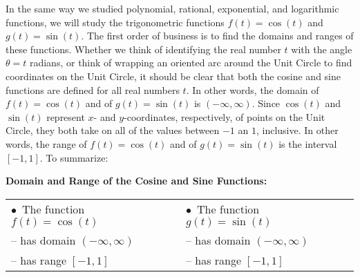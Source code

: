 In the same way we studied polynomial, rational, exponential, and logarithmic functions, we will study the trigonometric functions $f(t) = \cos(t)$ and $g(t) = \sin(t)$.  The first order of business is to find the domains and ranges of these functions.  Whether we think of identifying the real number $t$ with the angle $\theta = t$ radians, or think of wrapping an oriented arc around the Unit Circle to find coordinates on the Unit Circle, it should be clear that both the cosine and sine functions are defined for all real numbers $t$.  In other words, the domain  of $f(t) = \cos(t)$ and of $g(t) = \sin(t)$ is $(-\infty, \infty)$.  Since $\cos(t)$ and $\sin(t)$ represent $x$- and $y$-coordinates, respectively, of points on the Unit Circle, they both take on all of the values between $-1$ an $1$, inclusive.  In other words, the range of $f(t) = \cos(t)$ and of $g(t) = \sin(t)$ is the interval $[-1,1]$.  To summarize:

\smallskip

\colorbox{ResultColor}{\bbm

\begin{thm} \label{cosinesinefunctiondomainrange}  \textbf{Domain and Range of the Cosine and Sine Functions:} 

\vspace{.2in}

\begin{tabular}{ll}

\hspace{.3in} $\bullet \, $ The function $f(t) = \cos(t)$ & \hspace{.8in} $\bullet \, $ The function $g(t) = \sin(t)$ \\ [4pt]
\hspace{.5in} -- has domain $(-\infty, \infty)$ & \hspace{1in} -- has domain $(-\infty, \infty)$ \\ [4pt]
\hspace{.5in} -- has range $[-1,1]$ & \hspace{1in} -- has range $[-1,1]$ \\ [4pt]

\end{tabular}

\end{thm}

\ebm}

\smallskip
{}
\label{cosinesineequationsrealnumbers}

